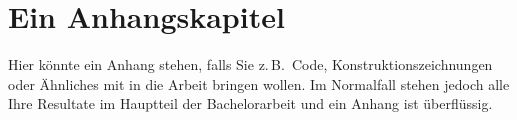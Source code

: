\chapter{Ein Anhangskapitel}

Hier könnte ein Anhang stehen, falls Sie z.\,B.\ Code, Konstruktionszeichnungen oder Ähnliches mit in die Arbeit bringen wollen.
Im Normalfall stehen jedoch alle Ihre Resultate im Hauptteil der Bachelorarbeit und ein Anhang ist überflüssig.